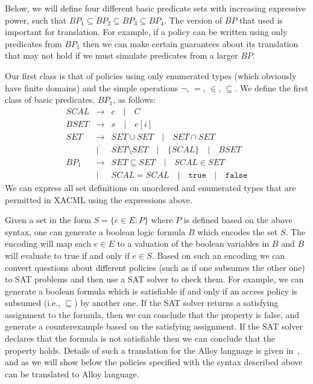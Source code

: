 Below, we will define four different basic predicate sets with
increasing expressive power, such that $BP_1 \subseteq BP_2 \subseteq
BP_3 \subseteq BP_4$.  The version of $BP$ that used is important for
translation. For example, if a policy can be written using only
predicates from $BP_1$ then we can make certain guarantees about its
translation that may not hold if we must simulate predicates from a
larger $BP$.

Our first class is that of policies using only enumerated types (which
obviously have finite domains) and the simple operations $\neg$, $=$,
$\in$, $\subseteq$.  We define the first class of basic predicates,
$BP_1$, as follows:
\begin{eqnarray*}
  SCAL & \rightarrow & c \quad | \quad C \\
  BSET & \rightarrow & s \quad | \quad e[i] \\
  SET & \rightarrow & SET \cup SET \quad | \quad SET \cap SET \\
  & | & SET \setminus SET \quad | \quad \{ SCAL \} \quad | \quad BSET \\
  BP_1 & \rightarrow & SET \subseteq SET \quad | \quad SCAL \in SET \\
  & | & SCAL = SCAL \quad | \quad \texttt{true} \quad | \quad \texttt{false}
\end{eqnarray*}
We can express all set definitions on unordered and enumerated types
that are permitted in XACML using the expressions above.

Given a set in the form $S = \{ e \in E : P \}$ where $P$ is defined
based on the above syntax, one can generate a boolean logic formula
$B$ which encodes the set $S$.  The encoding will map each $e \in E$
to a valuation of the boolean variables in $B$ and $B$ will evaluate
to true if and only if $e \in S$.  Based on such an encoding we can
convert questions about different policies (such as if one subsumes
the other one) to SAT problems and then use a SAT solver to check
them.  For example, we can generate a boolean formula which is
satisfiable if and only if an access policy is subsumed (i.e.,
$\sqsubseteq$) by another one.  If the SAT solver returns a satisfying
assignment to the formula, then we can conclude that the property is
false, and generate a counterexample based on the satisfying
assignment.  If the SAT solver declares that the formula is not
satisfiable then we can conclude that the property holds.  Details of
such a translation for the Alloy language is given
in~\cite{jackson00automating}, and as we will show below the policies
specified with the syntax described above can be translated to Alloy
language.

